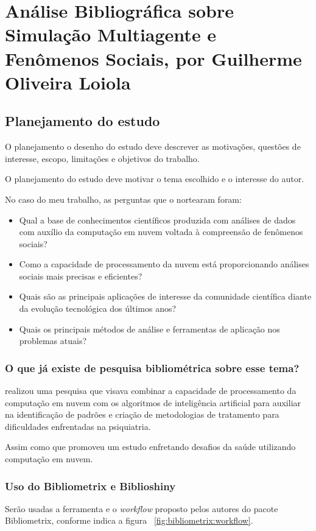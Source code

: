 \chapter{Análise Bibliográfica sobre Simulação Multiagente e Fenômenos Sociais, por Guilherme Oliveira Loiola\label{chap:bibliometria:jhcf}}

\section{Planejamento do estudo\label{MASSA@jhcf:questoes}}
O planejamento o  desenho do estudo deve descrever as motivações, questões de interesse, escopo, limitações e objetivos do trabalho.

O planejamento do estudo deve motivar o tema escolhido e o interesse do autor.

No caso do meu trabalho, as perguntas que o nortearam foram:
\begin{itemize}
    \item Qual a base de conhecimentos científicos produzida com análises de dados com auxílio da computação em nuvem voltada à compreensão de fenômenos sociais? 
    \item Como a capacidade de processamento da nuvem está proporcionando análises sociais mais precisas e eficientes? 
    \item Quais são as principais aplicações de interesse da comunidade científica diante da evolução tecnológica dos últimos anos?
    \item Quais os principais métodos de análise e ferramentas de aplicação nos problemas atuais?
\end{itemize}

\subsection{O que já existe de pesquisa bibliométrica sobre esse tema?}

\cite{ma_method_2020} realizou uma pesquisa que visava  combinar a capacidade de processamento da computação em nuvem com os algoritmos de inteligência artificial para auxiliar na identificação de padrões e criação de metodologias de tratamento para dificuldades enfrentadas na psiquiatria.

Assim como \cite{archenaa_interactive_2016} que promoveu um estudo enfretando desafios da saúde utilizando computação em nuvem.


\subsection{Uso do Bibliometrix e Biblioshiny}
Serão usadas a ferramenta e o \textit{workflow} proposto pelos autores do pacote Bibliometrix, conforme indica a figura ~\ref{fig:bibliometrix:workflow}.

